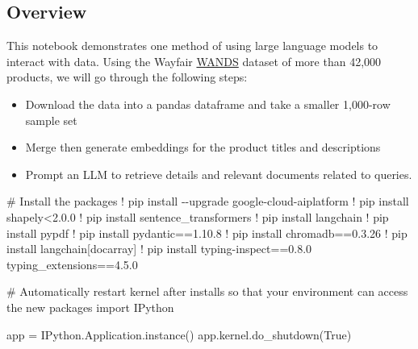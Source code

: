 \documentclass[
  letterpaper,
  DIV=11,
  numbers=noendperiod]{scrreprt}
\newenvironment{Shaded}{\begin{snugshade}}{\end{snugshade}}
\newcommand{\CommentTok}[1]{\textcolor[rgb]{0.37,0.37,0.37}{#1}}
\newcommand{\FloatTok}[1]{\textcolor[rgb]{0.68,0.00,0.00}{#1}}
\newcommand{\ImportTok}[1]{\textcolor[rgb]{0.00,0.46,0.62}{#1}}
\newcommand{\NormalTok}[1]{\textcolor[rgb]{0.00,0.23,0.31}{#1}}
\newcommand{\OperatorTok}[1]{\textcolor[rgb]{0.37,0.37,0.37}{#1}}
\newcommand{\VariableTok}[1]{\textcolor[rgb]{0.07,0.07,0.07}{#1}}
\begin{document}
\hypertarget{overview}{%
\subsection{Overview}\label{overview}}

This notebook demonstrates one method of using large language models to
interact with data. Using the Wayfair
\href{https://www.aboutwayfair.com/careers/tech-blog/wayfair-releases-wands-the-largest-and-richest-publicly-available-dataset-for-e-commerce-product-search-relevance}{WANDS}
dataset of more than 42,000 products, we will go through the following
steps:

\begin{itemize}
\item
  Download the data into a pandas dataframe and take a smaller 1,000-row
  sample set
\item
  Merge then generate embeddings for the product titles and descriptions
\item
  Prompt an LLM to retrieve details and relevant documents related to
  queries.
\end{itemize}

\begin{Shaded}
\begin{Highlighting}[]
\CommentTok{\# Install the packages}
\OperatorTok{!}\NormalTok{ pip install }\OperatorTok{{-}{-}}\NormalTok{upgrade google}\OperatorTok{{-}}\NormalTok{cloud}\OperatorTok{{-}}\NormalTok{aiplatform}
\OperatorTok{!}\NormalTok{ pip install shapely}\OperatorTok{\textless{}}\FloatTok{2.0.0}
\OperatorTok{!}\NormalTok{ pip install sentence\_transformers}
\OperatorTok{!}\NormalTok{ pip install langchain}
\OperatorTok{!}\NormalTok{ pip install pypdf}
\OperatorTok{!}\NormalTok{ pip install pydantic}\OperatorTok{==}\FloatTok{1.10.8}
\OperatorTok{!}\NormalTok{ pip install chromadb}\OperatorTok{==}\FloatTok{0.3.26}
\OperatorTok{!}\NormalTok{ pip install langchain[docarray]}
\OperatorTok{!}\NormalTok{ pip install typing}\OperatorTok{{-}}\NormalTok{inspect}\OperatorTok{==}\FloatTok{0.8.0}\NormalTok{ typing\_extensions}\OperatorTok{==}\FloatTok{4.5.0}
\end{Highlighting}
\end{Shaded}

\begin{Shaded}
\begin{Highlighting}[]
\CommentTok{\# Automatically restart kernel after installs so that your environment can access the new packages}
\ImportTok{import}\NormalTok{ IPython}

\NormalTok{app }\OperatorTok{=}\NormalTok{ IPython.Application.instance()}
\NormalTok{app.kernel.do\_shutdown(}\VariableTok{True}\NormalTok{)}
\end{Highlighting}
\end{Shaded}
\end{document}
